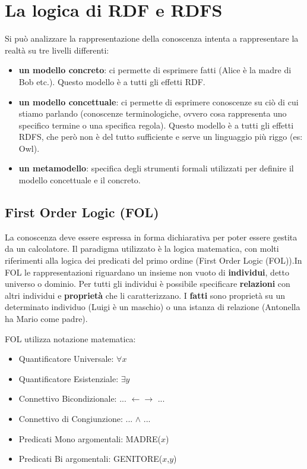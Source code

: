 \section{La logica di RDF e RDFS}
Si può analizzare la rappresentazione della conoscenza intenta a rappresentare la realtà su tre livelli differenti:
\begin{itemize}
	\item \textbf{un modello concreto}: ci permette di esprimere fatti (Alice è la madre di Bob etc.). Questo modello è a tutti gli effetti RDF.
	\item \textbf{un modello concettuale}: ci permette di esprimere conoscenze su ciò di cui stiamo parlando (conoscenze terminologiche, ovvero cosa rappresenta uno specifico termine o una specifica regola). Questo modello è a tutti gli effetti RDFS, che però non è del tutto sufficiente e serve un linguaggio più riggo (es: Owl).
	\item \textbf{un metamodello}: specifica degli strumenti formali utilizzati per definire il modello concettuale e il concreto.
\end{itemize}

\subsection{First Order Logic (FOL)}
La conoscenza deve essere espressa in forma dichiarativa per poter essere gestita da un calcolatore. Il paradigma utilizzato è la logica matematica, con molti riferimenti alla logica dei predicati del primo ordine (First Order Logic (FOL)).\newline In FOL le rappresentazioni riguardano un insieme non vuoto di \textbf{individui}, detto universo o dominio. Per tutti gli individui è possibile specificare \textbf{relazioni} con altri individui e \textbf{proprietà} che li caratterizzano. I \textbf{fatti} sono proprietà su un determinato individuo (Luigi è un maschio) o una istanza di relazione (Antonella ha Mario come padre).

FOL utilizza notazione matematica:
\begin{itemize}
	\item Quantificatore Universale: $\forall x$
	\item Quantificatore Esistenziale: $\exists y$
	\item Connettivo Bicondizionale: ... $\leftarrow\rightarrow$ ...
	\item Connettivo di Congiunzione: ... $\land$ ...
	\item Predicati Mono
	argomentali: MADRE($x$)
	\item Predicati Bi
	argomentali: GENITORE($x$,$y$)
\end{itemize}

